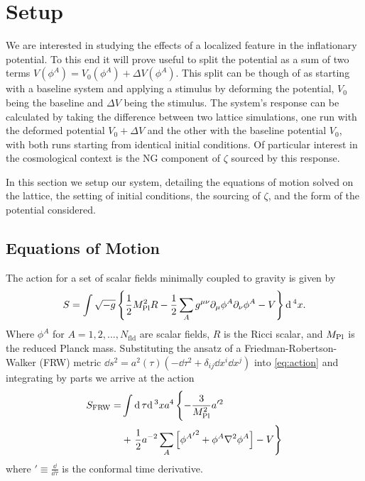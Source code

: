 
\section{Setup} \label{sec:setup}
We are interested in studying the effects of a localized feature in the inflationary potential.
To this end it will prove useful to split the potential as a sum of two terms $V(\phi^A) = V_0(\phi^A) + \Delta V(\phi^A)$.
This split can be though of as starting with a baseline system and applying a stimulus by deforming the potential, $V_0$ being the baseline and $\Delta V$ being the stimulus.
The system's response can be calculated by taking the difference between two lattice simulations, one run with the deformed potential $V_0+\Delta V$ and the other with the baseline potential $V_0$, with both runs starting from identical initial conditions.
Of particular interest in the cosmological context is the NG component of $\zeta$ sourced by this response.

In this section we setup our system, detailing the equations of motion solved on the lattice, the setting of initial conditions, the sourcing of $\zeta$, and the form of the potential considered.

\subsection{Equations of Motion}

The action for a set of scalar fields minimally coupled to gravity is given by
\begin{equation} \label{eq:action}
  S = \int \sqrt{-g}\left\{\frac{1}{2}M_{\mathrm{Pl}}^2R - \frac{1}{2}\sum_Ag^{\mu\nu}\partial_\mu\phi^A\partial_\nu\phi^A - V \right\}\mathrm{d}\,^4x.
\end{equation}
Where $\phi^A$ for $A=1,2,...,N_\mathrm{fld}$ are scalar fields, $R$ is the Ricci scalar, and $M_{\mathrm{Pl}}$ is the reduced Planck mass. 
Substituting the ansatz of a Friedman-Robertson-Walker (FRW) metric $\dd s^2 = a^2(\tau)\left( -\dd\tau^2 + \delta_{ij}\dd x^i\dd x^j \right)$ into \eqref{eq:action} and integrating by parts we arrive at the action
\begin{align} \label{eq:actionFRW}
  \begin{split}
    S_{\mathrm{FRW}} = &\int \dd\tau\dd^3xa^4\left\{
    - \frac{3}{\mpl^2}a'^2 \vphantom{\sum_A}\right. \\
    & + \left.\frac{1}{2}a^{-2}\sum_A\left[{{\phi^A}'}^2
      + \phi^A\nabla^2\phi^A\right] %
      - V \right\}
    \end{split}
\end{align}
where ${}' \equiv \frac{\dd}{\dd\tau}$ is the conformal time derivative.

